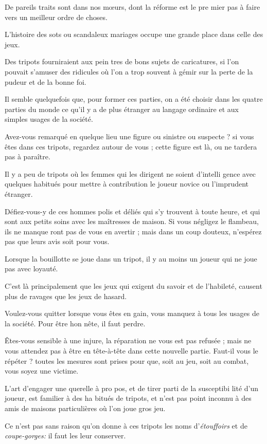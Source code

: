 De pareils traits sont dans nos 
m{\oe}urs, dont la réforme est le pre%
mier pas à faire vers un meilleur
ordre de choses.

L'histoire des sots ou scandaleux
mariages occupe une grande place
dans celle des jeux.

Des tripots fourniraient aux pein%
tres de bons sujets de caricatures, si
l'on pouvait s'amuser des ridicules
où l'on a trop souvent à gémir sur la
perte de la pudeur et de la bonne foi.

Il semble quelquefois que, pour
former ces parties, on a été choisir
dans les quatre parties du monde ce
qu'il y a de plus étranger au langage
ordinaire et aux simples usages de la 
société.

Avez-vous remarqué en quelque
lieu une figure ou sinistre ou suspecte ?
si vous êtes dans ces tripots, regardez
autour de vous ; cette figure est là, ou
ne tardera pas à paraître.

Il y a peu de tripots où les femmes
qui les dirigent ne soient d'intelli%
gence avec quelques habitués pour
mettre à contribution le joueur novice
ou l'imprudent étranger.

Défiez-vous-y de ces hommes polis
et déliés qui s'y trouvent à toute
heure, et qui sont aux petits soins
avec les maîtresses de maison. Si vous
négligez le flambeau, ils ne manque%
ront pas de vous en avertir ; mais dans
un coup douteux, n'espérez pas que
leurs avis soit pour vous.

Lorsque la bouillotte se joue dans
un tripot, il y au moins un joueur
qui ne joue pas avec loyauté.

C'est là principalement que les jeux
qui exigent du savoir et de l'habileté,
causent plus de ravages que les jeux
de hasard.

Voulez-vous quitter lorsque vous
êtes en gain, vous manquez à tous les
usages de la société. Pour être hon%
nête, il faut perdre.

Êtes-vous sensible à une injure, la
réparation ne vous est pas refusée ;
mais ne vous attendez pas à être en
tête-à-tête dans cette nouvelle partie.
Faut-il vous le répéter ? toutes les
mesures sont prises pour que, soit au
jeu, soit au combat, vous soyez une
victime.

L'art d'engager une querelle à pro%
pos, et de tirer parti de la susceptibi%
lité d'un joueur, est familier à des ha%
bitués de tripots, et n'est pas point inconnu
à des amis de maisons particulières
où l'on joue gros jeu.

Ce n'est pas sans raison qu'on donne
à ces tripots les noms d'\emph{étouffoirs} et de
\emph{coupe-gorges:} il faut les leur conserver.

